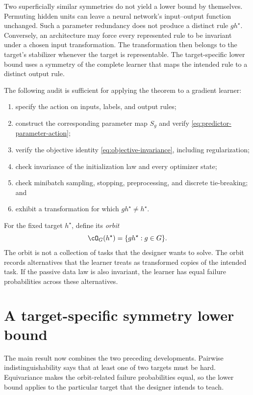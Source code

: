 \documentclass[11pt,twoside]{article}
\theoremstyle{definition}
\theoremstyle{remark}
\begin{document}
Two superficially similar symmetries do not yield a lower bound by themselves.
Permuting hidden units can leave a neural network's input--output function
unchanged. Such a parameter redundancy does not produce a distinct rule
\(gh^\star\). Conversely, an architecture may force every represented rule to
be invariant under a chosen input transformation. The transformation then
belongs to the target's stabilizer whenever the target is representable. The
target-specific lower bound uses a symmetry of the complete learner that maps
the intended rule to a distinct output rule.

The following audit is sufficient for applying the theorem to a gradient
learner:
\begin{enumerate}[leftmargin=*]
\item specify the action on inputs, labels, and output rules;
\item construct the corresponding parameter map \(S_g\) and verify
\cref{eq:predictor-parameter-action};
\item verify the objective identity \cref{eq:objective-invariance}, including
regularization;
\item check invariance of the initialization law and every optimizer state;
\item check minibatch sampling, stopping, preprocessing, and discrete
tie-breaking; and
\item exhibit a transformation for which \(gh^\star\ne h^\star\).
\end{enumerate}

For the fixed target \(h^\star\), define its \emph{orbit}
\begin{equation}
 \cO_G(h^\star)=\{gh^\star:g\in G\}.
 \label{eq:target-orbit}
\end{equation}
The orbit is not a collection of tasks that the designer wants to solve. The
orbit records alternatives that the learner treats as transformed copies of
the intended task. If the passive data law is also invariant, the learner has
equal failure probabilities across these alternatives.

\section{A target-specific symmetry lower bound}
\label{sec:lower-bound}

The main result now combines the two preceding developments. Pairwise
indistinguishability says that at least one of two targets must be hard.
Equivariance makes the orbit-related failure probabilities equal, so the lower
bound applies to the particular target that the designer intends to teach.
\end{document}

